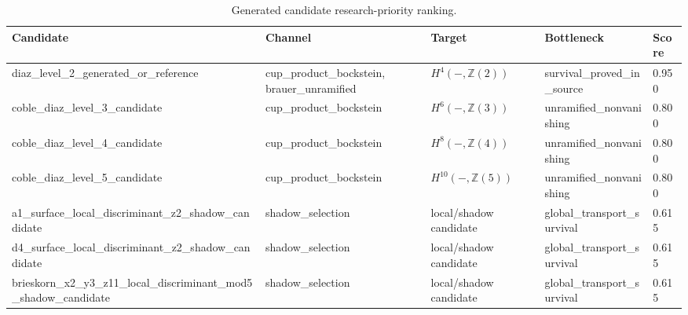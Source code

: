 \begin{table}[h]
\centering
\caption{Generated candidate research-priority ranking.}
\label{tab:candidate-generation}
\footnotesize
\begin{tabular}{|p{}|p{}|p{}|p{}|p{}|}
\hline
Candidate & Channel & Target & Bottleneck & Score \\
\hline
diaz\_\allowbreak{}level\_\allowbreak{}2\_\allowbreak{}generated\_\allowbreak{}or\_\allowbreak{}reference & cup\_\allowbreak{}product\_\allowbreak{}bockstein, brauer\_\allowbreak{}unramified & $H^4(-,\mathbb{Z}(2))$ & survival\_\allowbreak{}proved\_\allowbreak{}in\_\allowbreak{}source & 0.950 \\
coble\_\allowbreak{}diaz\_\allowbreak{}level\_\allowbreak{}3\_\allowbreak{}candidate & cup\_\allowbreak{}product\_\allowbreak{}bockstein & $H^6(-,\mathbb{Z}(3))$ & unramified\_\allowbreak{}nonvanishing & 0.800 \\
coble\_\allowbreak{}diaz\_\allowbreak{}level\_\allowbreak{}4\_\allowbreak{}candidate & cup\_\allowbreak{}product\_\allowbreak{}bockstein & $H^8(-,\mathbb{Z}(4))$ & unramified\_\allowbreak{}nonvanishing & 0.800 \\
coble\_\allowbreak{}diaz\_\allowbreak{}level\_\allowbreak{}5\_\allowbreak{}candidate & cup\_\allowbreak{}product\_\allowbreak{}bockstein & $H^10(-,\mathbb{Z}(5))$ & unramified\_\allowbreak{}nonvanishing & 0.800 \\
a1\_\allowbreak{}surface\_\allowbreak{}local\_\allowbreak{}discriminant\_\allowbreak{}z2\_\allowbreak{}shadow\_\allowbreak{}candidate & shadow\_\allowbreak{}selection & local/shadow candidate & global\_\allowbreak{}transport\_\allowbreak{}survival & 0.615 \\
d4\_\allowbreak{}surface\_\allowbreak{}local\_\allowbreak{}discriminant\_\allowbreak{}z2\_\allowbreak{}shadow\_\allowbreak{}candidate & shadow\_\allowbreak{}selection & local/shadow candidate & global\_\allowbreak{}transport\_\allowbreak{}survival & 0.615 \\
brieskorn\_\allowbreak{}x2\_\allowbreak{}y3\_\allowbreak{}z11\_\allowbreak{}local\_\allowbreak{}discriminant\_\allowbreak{}mod5\_\allowbreak{}shadow\_\allowbreak{}candidate & shadow\_\allowbreak{}selection & local/shadow candidate & global\_\allowbreak{}transport\_\allowbreak{}survival & 0.615 \\
\hline
\end{tabular}
\end{table}
